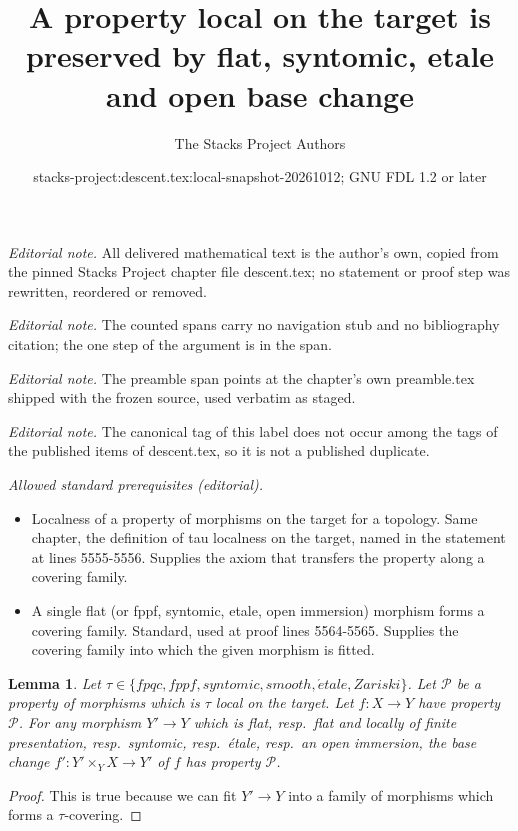 \documentclass{stacks-project}
\title{A property local on the target is preserved by flat, syntomic, etale and open base change}
\author{The Stacks Project Authors}
\date{stacks-project:descent.tex:local-snapshot-20261012; GNU FDL 1.2 or later}
\theoremstyle{plain}
\newtheorem{lemma}[subsection]{Lemma}
\theoremstyle{definition}
\theoremstyle{remark}
\numberwithin{equation}{subsection}
\def\etale{{\acute{e}tale}}
\begin{document}
\maketitle
\noindent\textit{Editorial note.} All delivered mathematical text is the author's own, copied from the pinned Stacks Project chapter file descent.tex; no statement or proof step was rewritten, reordered or removed.\par\medskip
\noindent\textit{Editorial note.} The counted spans carry no navigation stub and no bibliography citation; the one step of the argument is in the span.\par\medskip
\noindent\textit{Editorial note.} The preamble span points at the chapter's own preamble.tex shipped with the frozen source, used verbatim as staged.\par\medskip
\noindent\textit{Editorial note.} The canonical tag of this label does not occur among the tags of the published items of descent.tex, so it is not a published duplicate.\par\medskip
\noindent\textit{Allowed standard prerequisites (editorial).}\begin{itemize}
\item Localness of a property of morphisms on the target for a topology. Same chapter, the definition of tau localness on the target, named in the statement at lines 5555-5556. Supplies the axiom that transfers the property along a covering family.
\item A single flat (or fppf, syntomic, etale, open immersion) morphism forms a covering family. Standard, used at proof lines 5564-5565. Supplies the covering family into which the given morphism is fitted.
\end{itemize}\medskip
\begin{lemma}
\label{lemma-pullback-property-local-target}
Let $\tau \in \{fpqc, fppf, syntomic, smooth, \etale, Zariski\}$.
Let $\mathcal{P}$ be a property of morphisms which is $\tau$ local
on the target. Let $f : X \to Y$ have property $\mathcal{P}$.
For any morphism $Y' \to Y$ which is
flat, resp.\ flat and locally of finite presentation, resp.\ syntomic,
resp.\ \'etale, resp.\ an open immersion, the base change
$f' : Y' \times_Y X \to Y'$ of $f$ has property $\mathcal{P}$.
\end{lemma}

\begin{proof}
This is true because we can fit $Y' \to Y$ into a family of
morphisms which forms a $\tau$-covering.
\end{proof}
\end{document}
